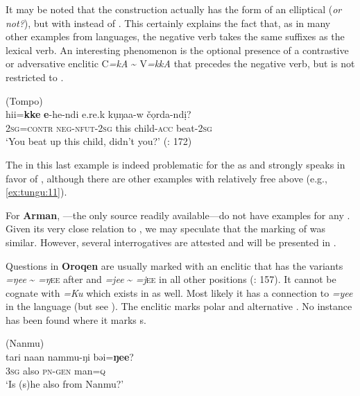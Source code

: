 \noindent It may be noted that the construction actually has the form of an elliptical  (\textit{or not?}), but with  instead of . This certainly explains the fact that, as in many other examples from  languages, the negative verb takes the same suffixes as the lexical verb. An interesting phenomenon is the optional presence of a contrastive or adversative enclitic C\textit{=kA} {\textasciitilde} V\textit{=kkA} that precedes the negative verb, but is not restricted to  \citep[112]{Benzing1955}.

\ea%
    \label{ex:tungu:16}
     (Tompo)\\
    \gll hi{i=}\textbf{{kke}} \textbf{{e}}{-he-ndi} e{.re}{.k} kụŋa{a-w} čọrda-ndị?\\
    2\textsc{sg}=\textsc{contr}  \textsc{neg}-\textsc{nfut}-2\textsc{sg}  this  child-\textsc{acc}  beat-2\textsc{sg}\\
    \glt ‘You beat up this child, didn’t you?’ (\citealt{Matić2016}: 172)
    \z

\noindent The  in this last example  is indeed problematic for the  as  and strongly speaks in favor of  , although there are other examples with relatively free  above (e.g., \ref{ex:tungu:11}).

For \textbf{Arman}, \cite{DoerferKnüppel2013}---the only source readily available---do not have examples for any . Given its very close relation to , we may speculate that the marking of  was similar. However, several interrogatives are attested and will be presented in .

Questions in \textbf{Oroqen} are usually marked with an enclitic that has the variants \textit{=ŋee} {\textasciitilde} \textit{=ŋ}\textsc{ee} after  and \textit{=jee} {\textasciitilde} \textit{=j}\textsc{ee} in all other positions (\citealt{HuZengyi2001}: 157). It cannot be cognate with  \textit{=Ku} which exists in  as well. Most likely it has a connection to \textit{=yee} in the  language  (but see \citealt{Whaley2005}). The enclitic marks polar and alternative . No instance has been found where it marks s.

\ea%
    \label{ex:tungu:17}
     (Nanmu)\\
    \ea
    \gll tari naan  nammu-ŋi  bəi=\textbf{{ŋee}}?\\
    3\textsc{sg}  also  \textsc{pn}-\textsc{gen}    man=\textsc{q}\\
    \glt ‘Is (s)he also from Nanmu?’
    

